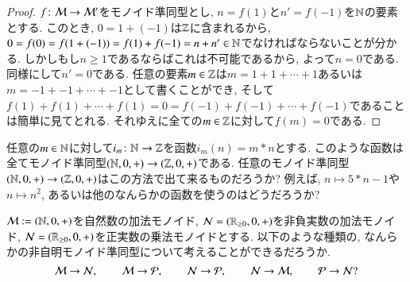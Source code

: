 \begin{proof}


$f\colon\mathcal{M}\rightarrow\mathcal{M}'$をモノイド準同型とし, $n=f(1)$と$n'=f(-1)$を${\mathbb N}$の要素とする. このとき, $0=1+(-1)$は${\mathbb Z}$に含まれるから, $0=f(0)=f(1+(-1))=f(1)+f(-1)=n+n'\in{\mathbb N}$でなければならないことが分かる. しかしもし$n\geq 1$であるならばこれは不可能であるから, よって$n=0$である. 同様にして$n'=0$である. 任意の要素$m\in{\mathbb Z}$は$m=1+1+\cdots+1$あるいは$m=-1+-1+\cdots+-1$として書くことができ, そして$f(1)+f(1)+\cdots+f(1)=0=f(-1)+f(-1)+\cdots+f(-1)$であることは簡単に見てとれる. それゆえに全ての$m\in{\mathbb Z}$に対して$f(m)=0$である.

\end{proof}

\begin{exercise}
任意の$m\in{\mathbb N}$に対して$i_m\colon{\mathbb N}\rightarrow{\mathbb Z}$を函数$i_m(n)=m*n$とする. このような函数は全てモノイド準同型$({\mathbb N},0,+)\rightarrow({\mathbb Z},0,+)$である. 任意のモノイド準同型$({\mathbb N},0,+)\rightarrow({\mathbb Z},0,+)$はこの方法で出て来るものだろうか? 例えば, $n\mapsto 5*n-1$や$n\mapsto n^2$, あるいは他のなんらかの函数を使うのはどうだろうか?
\end{exercise}

\begin{exercise}
$\mathcal{M}:=({\mathbb N},0,+)$を自然数の加法モノイド, $\mathcal{N}=({\mathbb R}_{\geq0},0,+)$を非負実数の加法モノイド, $\mathcal{N}=({\mathbb R}_{\geq0},0,+)$を正実数の乗法モノイドとする. 以下のような種類の, なんらかの非自明モノイド準同型について考えることができるだろうか.  $$\mathcal{M}\rightarrow\mathcal{N},\hspace{.3in}\mathcal{M}\rightarrow\mathcal{P},\hspace{.3in}\mathcal{N}\rightarrow\mathcal{P},\hspace{.3in} \mathcal{N}\rightarrow\mathcal{M},\hspace{.3in}\mathcal{P}\rightarrow\mathcal{N}?$$
\end{exercise}


